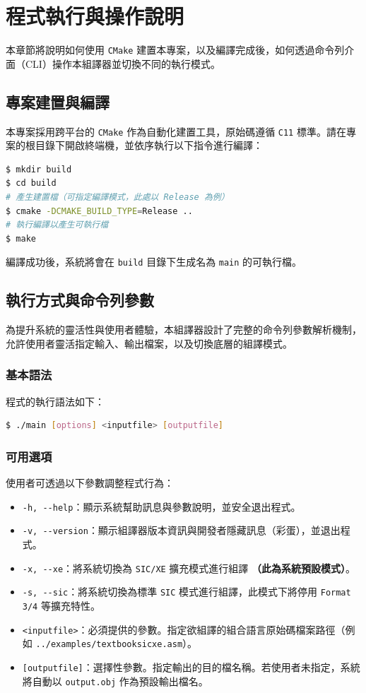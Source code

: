\chapter{程式執行與操作說明}

本章節將說明如何使用 \lstinline{CMake} 建置本專案，以及編譯完成後，如何透過命令列介面（CLI）操作本組譯器並切換不同的執行模式。

\section{專案建置與編譯}
本專案採用跨平台的 \lstinline{CMake} 作為自動化建置工具，原始碼遵循 \lstinline{C11} 標準。請在專案的根目錄下開啟終端機，並依序執行以下指令進行編譯：

\begin{lstlisting}[language=bash, caption={編譯專案指令}, frame=single]
$ mkdir build
$ cd build
# 產生建置檔（可指定編譯模式，此處以 Release 為例）
$ cmake -DCMAKE_BUILD_TYPE=Release ..
# 執行編譯以產生可執行檔
$ make
\end{lstlisting}

編譯成功後，系統將會在 \lstinline{build} 目錄下生成名為 \lstinline{main} 的可執行檔。

\section{執行方式與命令列參數}
為提升系統的靈活性與使用者體驗，本組譯器設計了完整的命令列參數解析機制，允許使用者靈活指定輸入、輸出檔案，以及切換底層的組譯模式。

\subsection{基本語法}
程式的執行語法如下：
\begin{lstlisting}[language=bash, frame=single]
$ ./main [options] <inputfile> [outputfile]
\end{lstlisting}

\subsection{可用選項}
使用者可透過以下參數調整程式行為：
\begin{itemize}
    \item \lstinline{-h, --help}：顯示系統幫助訊息與參數說明，並安全退出程式。
    \item \lstinline{-v, --version}：顯示組譯器版本資訊與開發者隱藏訊息（彩蛋），並退出程式。
    \item \lstinline{-x, --xe}：將系統切換為 \lstinline{SIC/XE} 擴充模式進行組譯 \textbf{（此為系統預設模式）}。
    \item \lstinline{-s, --sic}：將系統切換為標準 \lstinline{SIC} 模式進行組譯，此模式下將停用 \lstinline{Format 3/4} 等擴充特性。
    \item \lstinline{<inputfile>}：必須提供的參數。指定欲組譯的組合語言原始碼檔案路徑（例如 \lstinline{../examples/textbooksicxe.asm}）。
    \item \lstinline{[outputfile]}：選擇性參數。指定輸出的目的檔名稱。若使用者未指定，系統將自動以 \lstinline{output.obj} 作為預設輸出檔名。
\end{itemize}

